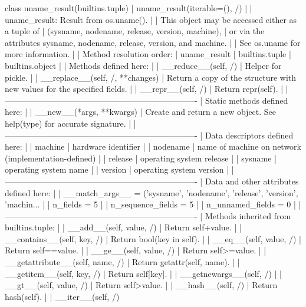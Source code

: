 \documentclass{article}
\begin{document}
    class uname_result(builtins.tuple)
     |  uname_result(iterable=(), /)
     |
     |  uname_result: Result from os.uname().
     |
     |  This object may be accessed either as a tuple of
     |    (sysname, nodename, release, version, machine),
     |  or via the attributes sysname, nodename, release, version, and machine.
     |
     |  See os.uname for more information.
     |
     |  Method resolution order:
     |      uname_result
     |      builtins.tuple
     |      builtins.object
     |
     |  Methods defined here:
     |
     |  __reduce__(self, /)
     |      Helper for pickle.
     |
     |  __replace__(self, /, **changes)
     |      Return a copy of the structure with new values for the specified fields.
     |
     |  __repr__(self, /)
     |      Return repr(self).
     |
     |  ----------------------------------------------------------------------
     |  Static methods defined here:
     |
     |  __new__(*args, **kwargs)
     |      Create and return a new object.  See help(type) for accurate signature.
     |
     |  ----------------------------------------------------------------------
     |  Data descriptors defined here:
     |
     |  machine
     |      hardware identifier
     |
     |  nodename
     |      name of machine on network (implementation-defined)
     |
     |  release
     |      operating system release
     |
     |  sysname
     |      operating system name
     |
     |  version
     |      operating system version
     |
     |  ----------------------------------------------------------------------
     |  Data and other attributes defined here:
     |
     |  __match_args__ = ('sysname', 'nodename', 'release', 'version', 'machin...
     |
     |  n_fields = 5
     |
     |  n_sequence_fields = 5
     |
     |  n_unnamed_fields = 0
     |
     |  ----------------------------------------------------------------------
     |  Methods inherited from builtins.tuple:
     |
     |  __add__(self, value, /)
     |      Return self+value.
     |
     |  __contains__(self, key, /)
     |      Return bool(key in self).
     |
     |  __eq__(self, value, /)
     |      Return self==value.
     |
     |  __ge__(self, value, /)
     |      Return self>=value.
     |
     |  __getattribute__(self, name, /)
     |      Return getattr(self, name).
     |
     |  __getitem__(self, key, /)
     |      Return self[key].
     |
     |  __getnewargs__(self, /)
     |
     |  __gt__(self, value, /)
     |      Return self>value.
     |
     |  __hash__(self, /)
     |      Return hash(self).
     |
     |  __iter__(self, /)
\end{document}
